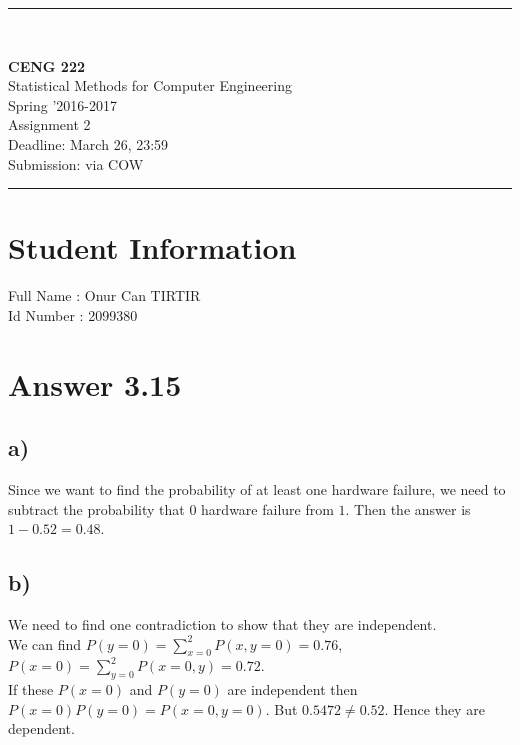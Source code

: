 \documentclass[12pt]{article}
\newcommand{\HRule}{\rule{\linewidth}{1mm}}
\begin{document}
\noindent
\HRule \\[3mm]
\begin{flushright}

                                         \LARGE \textbf{CENG 222}  \\[4mm]
                                         \Large Statistical Methods for Computer Engineering \\[4mm]
                                        \normalsize      Spring '2016-2017 \\
                                           \Large   Assignment 2 \\
					\normalsize Deadline: March 26, 23:59 \\
					\normalsize Submission: via COW
\end{flushright}
\HRule

\section*{Student Information } 
Full Name :  Onur Can TIRTIR\\
Id Number :  2099380\\

\section*{Answer 3.15}

\subsection*{a)}

Since we want to find the probability of at least one hardware failure, we need to subtract the probability that $0$ hardware failure from $1$.
Then the answer is $1-0.52=0.48$.

\subsection*{b)}

We need to find one contradiction to show that they are independent. \\
We can find $P(y=0)=\sum_{x=0}^2 P(x, y=0)=0.76$, $P(x=0)=\sum_{y=0}^2 P(x=0, y)=0.72$.\\
If these $P(x=0)$ and $P(y=0)$ are independent then $P(x=0)P(y=0)=P(x=0, y=0)$. But $0.5472 \neq 0.52$. Hence they are dependent.
\end{document}
